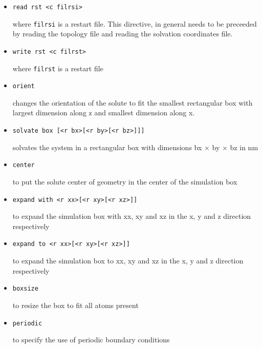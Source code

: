 \begin{itemize}
\item
\begin{verbatim}
read rst <c filrsi>
\end{verbatim}
where {\tt filrsi} is a restart file. This directive, in general needs
to be preceeded by reading the topology file and reading the solvation
coordinates file.

\item
\begin{verbatim}
write rst <c filrst>
\end{verbatim}
where {\tt filrst} is a restart file

\item
\begin{verbatim}
orient
\end{verbatim}
changes the orientation of the solute to fit the smallest rectangular
box with largest dimension along z and smallest dimension along x.

\item
\begin{verbatim}
solvate box [<r bx>[<r by>[<r bz>]]]
\end{verbatim}
solvates the system in a rectangular box with dimensions 
bx $\times$ by $\times$ bz in nm

\item
\begin{verbatim}
center
\end{verbatim}
to put the solute center of geometry in the center of the
simulation box

\item
\begin{verbatim}
expand with <r xx>[<r xy>[<r xz>]]
\end{verbatim}
to expand the simulation box with xx, xy and xz in the
x, y and z direction respectively

\item
\begin{verbatim}
expand to <r xx>[<r xy>[<r xz>]]
\end{verbatim}
to expand the simulation box to xx, xy and xz in the
x, y and z direction respectively

\item
\begin{verbatim}
boxsize
\end{verbatim}
to resize the box to fit all atoms present

\item
\begin{verbatim}
periodic
\end{verbatim}
to specify the use of periodic boundary conditions


\end{itemize}
